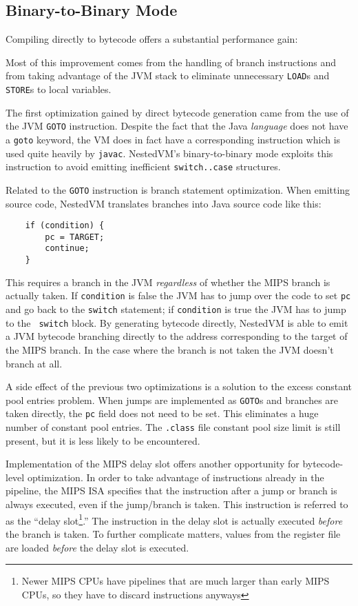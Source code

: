 \documentclass{acmconf}
\begin{document}
\subsection{Binary-to-Binary Mode}

Compiling directly to bytecode offers a substantial performance gain:


Most of this improvement comes from the handling of branch
instructions and from taking advantage of the JVM stack to eliminate
unnecessary {\tt LOAD}s and {\tt STORE}s to local variables.

The first optimization gained by direct bytecode generation came from
the use of the JVM {\tt GOTO} instruction.  Despite the fact that the
Java {\it language} does not have a {\tt goto} keyword, the VM does in
fact have a corresponding instruction which is used quite heavily by
{\tt javac}.  NestedVM's binary-to-binary mode exploits this
instruction to avoid emitting inefficient {\tt switch..case}
structures.

Related to the {\tt GOTO} instruction is branch statement
optimization.  When emitting source code, NestedVM translates branches
into Java source code like this:

{\footnotesize\begin{verbatim}
    if (condition) {
        pc = TARGET;
        continue;
    }
\end{verbatim}}

This requires a branch in the JVM {\it regardless} of whether the MIPS
branch is actually taken.  If {\tt condition} is false the JVM has to
jump over the code to set {\tt pc} and go back to the {\tt switch}
statement; if {\tt condition} is true the JVM has to jump to the {\tt
switch} block.  By generating bytecode directly, NestedVM is able to
emit a JVM bytecode branching directly to the address corresponding to
the target of the MIPS branch.  In the case where the branch is not
taken the JVM doesn't branch at all.

A side effect of the previous two optimizations is a solution to the
excess constant pool entries problem.  When jumps are implemented as
{\tt GOTO}s and branches are taken directly, the {\tt pc} field does
not need to be set.  This eliminates a huge number of constant pool
entries.  The {\tt .class} file constant pool size limit is still
present, but it is less likely to be encountered.

Implementation of the MIPS delay slot offers another opportunity for
bytecode-level optimization.  In order to take advantage of
instructions already in the pipeline, the MIPS ISA specifies that the
instruction after a jump or branch is always executed, even if the
jump/branch is taken.  This instruction is referred to as the ``delay
slot\footnote{Newer MIPS CPUs have pipelines that are much larger than
early MIPS CPUs, so they have to discard instructions anyways}.''  The
instruction in the delay slot is actually executed {\it before} the
branch is taken.  To further complicate matters, values from the
register file are loaded {\it before} the delay slot is executed.
\end{document}
